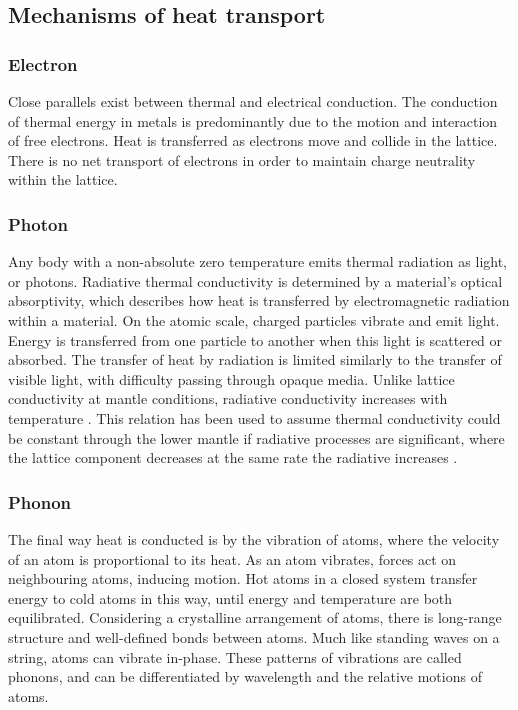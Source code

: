 \subsection{Mechanisms of heat transport}

\subsubsection{Electron}

Close parallels exist between thermal and electrical conduction. The conduction of thermal energy in metals is predominantly due to the motion and interaction of free electrons. Heat is transferred as electrons move and collide in the lattice. There is no net transport of electrons in order to maintain charge neutrality within the lattice.

\subsubsection{Photon}

Any body with a non-absolute zero temperature emits thermal radiation as light, or photons. Radiative thermal conductivity is determined by a material's optical absorptivity, which describes how heat is transferred by electromagnetic radiation within a material. On the atomic scale, charged particles vibrate and emit light. Energy is transferred from one particle to another when this light is scattered or absorbed. The transfer of heat by radiation is limited similarly to the transfer of visible light, with difficulty passing through opaque media. Unlike lattice conductivity at mantle conditions, radiative conductivity increases with temperature \citep{Hofmeister1999}. This relation has been used to assume thermal conductivity could be constant through the lower mantle if radiative processes are significant, where the lattice component decreases at the same rate the radiative increases \citep{Tang2014}.

\subsubsection{Phonon}

The final way heat is conducted is by the vibration of atoms, where the velocity of an atom is proportional to its heat. As an atom vibrates, forces act on neighbouring atoms, inducing motion. Hot atoms in a closed system transfer energy to cold atoms in this way, until energy and temperature are both equilibrated. Considering a crystalline arrangement of atoms, there is long-range structure and well-defined bonds between atoms. Much like standing waves on a string, atoms can vibrate in-phase. These patterns of vibrations are called phonons, and can be differentiated by wavelength and the relative motions of atoms.

